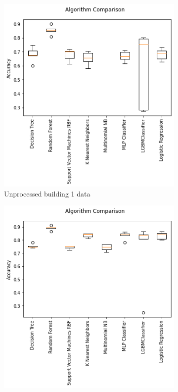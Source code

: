 \documentclass[a4paper,singleside,12pt]{report} %
\begin{document}
			
			\begin{figure}[!htb]
			  \centering
			  \begin{subfigure}[b]{0.48\linewidth}
			    \includegraphics[width=\linewidth]{./figures/results_model_comparison_unprocessed_building1_data.png}
			     \caption{Unprocessed building 1 data}
			  \end{subfigure}
			  \begin{subfigure}[b]{0.48\linewidth}
			    \includegraphics[width=\linewidth]{./figures/results_model_comparison_preprocessed_building1_data.png}

\end{subfigure}
\end{figure}
\end{document}
